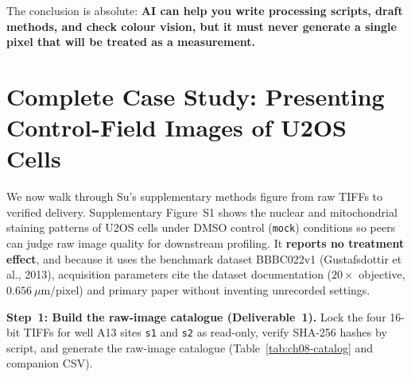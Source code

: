 The conclusion is absolute: \textbf{AI can help you write processing scripts, draft methods, and check colour vision, but it must never generate a single pixel that will be treated as a measurement.}

\section{Complete Case Study: Presenting Control-Field Images of U2OS Cells}

We now walk through Su's supplementary methods figure from raw TIFFs to verified delivery. Supplementary Figure~S1 shows the nuclear and mitochondrial staining patterns of U2OS cells under DMSO control (\texttt{mock}) conditions so peers can judge raw image quality for downstream profiling. It \textbf{reports no treatment effect}, and because it uses the benchmark dataset BBBC022v1 (Gustafsdottir et al., 2013), acquisition parameters cite the dataset documentation ($20\times$ objective, $0.656\ \mu\text{m/pixel}$) and primary paper without inventing unrecorded settings.

\textbf{Step~1: Build the raw-image catalogue (Deliverable~1).} Lock the four 16-bit TIFFs for well A13 sites \texttt{s1} and \texttt{s2} as read-only, verify SHA-256 hashes by script, and generate the raw-image catalogue (Table~\ref{tab:ch08-catalog} and companion CSV).

